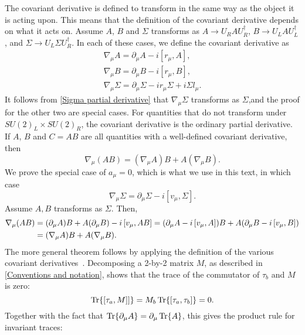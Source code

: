 The covariant derivative is defined to transform in the same way as the object it is acting upon.
This means that the definition of the covariant derivative depends on what it acts on.
Assume $A$, $B$ and $\Sigma$ transforms as $A \rightarrow U_R A U_R^\dagger$, $B \rightarrow U_L A U_L^\dagger$, and $\Sigma \rightarrow U_L \Sigma U_R^\dagger$.
In each of these cases, we define the covariant derivative as
\begin{align}
    \label{covariant derivative general}
    \nabla_\mu A = \partial_\mu A - i [r_\mu, A], \\
    \nabla_\mu B = \partial_\mu B - i [r_\mu, B], \\
    \nabla_\mu \Sigma = \partial_\mu \Sigma - i r_\mu \Sigma + i \Sigma l_\mu.
\end{align}
It follows from \cref{Sigma partial derivative} that $\nabla_\mu \Sigma$ transforms as $\Sigma$,and the proof for the other two are special cases.
For quantities that do not transform under $SU(2)_L\times SU(2)_R$, the covariant derivative is the ordinary partial derivative.
If $A$, $B$ and $C = AB$ are all quantities with a well-defined covariant derivative, then
\begin{equation}
    \nabla_\mu (AB) = (\nabla_\mu A) B + A (\nabla_\mu B).
\end{equation}
We prove the special case of $a_\mu = 0$, which is what we use in this text, in which case
\begin{equation}
    \nabla_\mu \Sigma = \partial_\mu \Sigma - i [v_\mu, \Sigma].
\end{equation}
Assume $A, B$ transforms as $\Sigma$. 
Then,
\begin{align*}
    \nabla_\mu (A B) 
    & = (\partial_\mu A) B + A (\partial_\mu B) - i \left[v_\mu, AB \right]
    = (\partial_\mu A - i \left[v_\mu, A \right])B + A(\partial_\mu B- i \left[v_\mu, B \right])\\
    & = (\nabla_\mu A)B + A (\nabla_\mu B).
\end{align*}
The more general theorem follows by applying the definition of the various covariant derivatives~\cite{Scherer:PhysRevD.53.315}.
Decomposing a 2-by-2 matrix $M$, as described in \autoref{Conventions and notation}, shows that the trace of the commutator of $\tau_b$ and $M$ is zero:
\begin{equation*}
    \Tr{\left[\tau_a, M \right]]} = M_b\Tr{ \left[\tau_a, \tau_b \right]} = 0.
\end{equation*}
Together with the fact that $\Tr{\partial_\mu A} = \partial_\mu \Tr{A}$, this gives the product rule for invariant traces:
